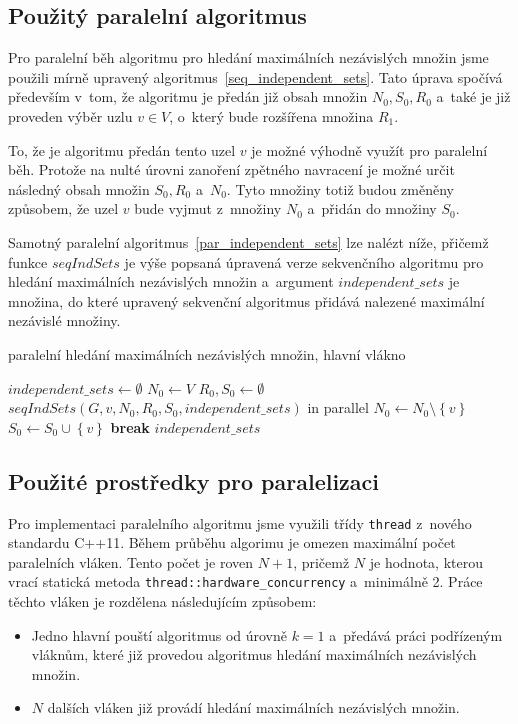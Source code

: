 \documentclass[12pt]{article}
\newcommand{\setHelper}[1]{\left\lbrace #1 \right\rbrace}
\begin{document}
\subsection{Použitý paralelní algoritmus}
Pro paralelní běh algoritmu pro hledání maximálních nezávislých množin jsme použili mírně upravený algoritmus~\ref{seq_independent_sets}. Tato úprava spočívá především v~tom, že algoritmu je předán již obsah množin $N_0, S_0, R_0$ a~také je již proveden výběr uzlu $v \in V$, o~který bude rozšířena množina $R_1$. 

To, že je algoritmu předán tento uzel $v$ je možné výhodně využít pro paralelní běh. Protože na nulté úrovni zanoření zpětného navracení je možné určit následný obsah množin $S_0, R_0$ a~$N_0$. Tyto množiny totiž budou změněny způsobem, že uzel $v$ bude vyjmut z~množiny $N_0$ a~přidán do množiny $S_0$.

Samotný paralelní algoritmus~\ref{par_independent_sets} lze nalézt níže, přičemž funkce $seqIndSets$ je výše popsaná úpravená verze sekvenčního algoritmu pro hledání maximálních nezávislých množin a~argument $independent\_sets$ je množina, do které upravený sekvenční algoritmus přidává nalezené maximální nezávislé množiny. 

\begin{algorithm}[H]
\caption{paralelní hledání maximálních nezávislých množin, hlavní vlákno}
\label{par_independent_sets}
\begin{algorithmic}
\State $independent\_sets \leftarrow \emptyset$
\State $N_0 \leftarrow V$
\State $R_0, S_0 \leftarrow \emptyset$
    \State $seqIndSets(G, v, N_0, R_0, S_0, independent\_sets)$ in parallel
    \State $N_0 \leftarrow N_0 \setminus \setHelper{v}$
    \State $S_0 \leftarrow S_0 \cup \setHelper{v}$
        \State \textbf{break}
    \EndIf
\EndFor
\State \Return $independent\_sets$
\EndFunction
\end{algorithmic}
\end{algorithm}


\subsection{Použité prostředky pro paralelizaci}
Pro implementaci paralelního algoritmu jsme využili třídy \texttt{thread} z~nového standardu C++11. Během průběhu algorimu je omezen maximální počet paralelních vláken. Tento počet je roven $N+1$, pričemž $N$ je hodnota, kterou vrací statická metoda \texttt{thread::hardware\_concurrency} a~minimálně 2. Práce těchto vláken je rozdělena následujícím způsobem:
\begin{itemize}
    \item Jedno hlavní pouští algoritmus od úrovně $k=1$ a~předává práci podřízeným vláknům, které již provedou algoritmus hledání maximálních nezávislých množin.
    \item $N$ dalších vláken již provádí hledání maximálních nezávislých množin.
\end{itemize}
\end{document}
